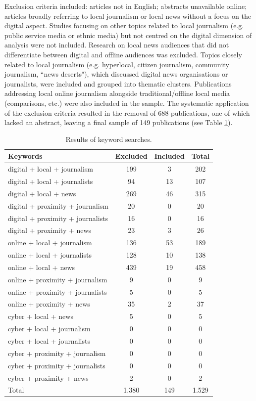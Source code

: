 \documentclass[english]{textolivre}
\begin{document}
Exclusion criteria included: articles not in English; abstracts unavailable online; articles broadly referring to local journalism or local news without a focus on the digital aspect. Studies focusing on other topics related to local journalism (e.g. public service media or ethnic media) but not centred on the digital dimension of analysis were not included. Research on local news audiences that did not differentiate between digital and offline audiences was excluded. Topics closely related to local journalism (e.g. hyperlocal, citizen journalism, community journalism, ``news deserts"), which discussed digital news organisations or journalists, were included and grouped into thematic clusters. Publications addressing local online journalism alongside traditional/offline local media (comparisons, etc.) were also included in the sample. The systematic application of the exclusion criteria resulted in the removal of 688 publications, one of which lacked an abstract, leaving a final sample of 149 publications (see Table \ref{tab-1}).

\begin{table}[h!]
\centering
\begin{threeparttable}
\caption{Results of keyword searches.}\label{tab-1}
\begin{tabular}{lccc}
\toprule
Keywords & Excluded & Included & Total \\
\midrule
digital + local + journalism & 199 & 3  & 202 \\
digital + local + journalists & 94 & 13 & 107 \\
digital + local + news & 269 & 46 & 315 \\
digital + proximity + journalism & 20 & 0 & 20 \\
digital + proximity + journalists & 16 & 0 & 16 \\
digital + proximity + news & 23 & 3 & 26 \\
online + local + journalism & 136 & 53 & 189 \\
online + local + journalists & 128 & 10 & 138 \\
online + local + news & 439 & 19 & 458 \\
online + proximity + journalism & 9 & 0 & 9 \\
online + proximity + journalists & 5 & 0 & 5 \\
online + proximity + news & 35 & 2 & 37 \\
cyber + local + news & 5 & 0 & 5 \\
cyber + local + journalism & 0 & 0 & 0 \\
cyber + local + journalists & 0 & 0 & 0 \\
cyber + proximity + journalism & 0 & 0 & 0 \\
cyber + proximity + journalists & 0 & 0 & 0 \\
cyber + proximity + news & 2 & 0 & 2 \\
\addlinespace[0.3em]
Total & 1.380 & 149 & 1.529 \\
\bottomrule
\end{tabular}
\end{threeparttable}
\end{table}
\end{document}
